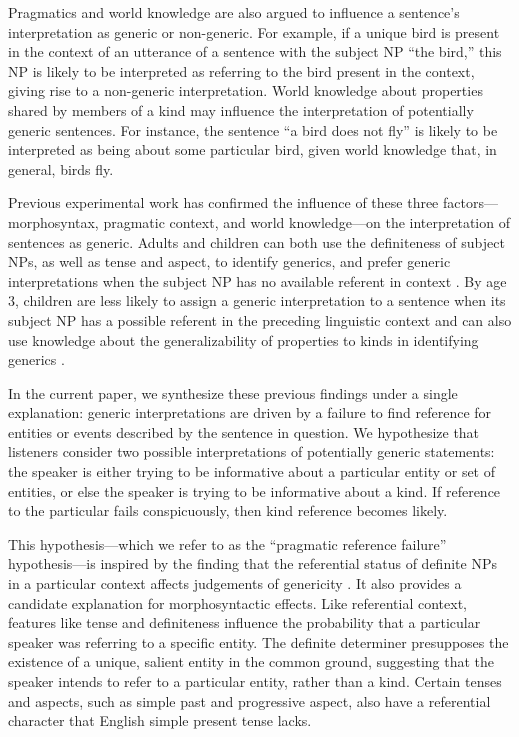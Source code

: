 \documentclass[10pt,letterpaper]{article}
\begin{document}
Pragmatics and world knowledge are also argued to influence a sentence's interpretation as generic or non-generic. For example, if a unique bird is present in the context of an utterance of a sentence with the subject NP ``the bird,'' this NP is likely to be interpreted as referring to the bird present in the context, giving rise to a non-generic interpretation. World knowledge about properties shared by members of a kind may influence the interpretation of potentially generic sentences. For instance, the sentence ``a bird does not fly'' is likely to be interpreted as being about some particular bird, given world knowledge that, in general, birds fly.

Previous experimental work has confirmed the influence of these three factors---morphosyntax, pragmatic context, and world knowledge---on the interpretation of sentences as generic. Adults and children can both use the definiteness of subject NPs, as well as tense and aspect, to identify generics, and prefer generic interpretations when the subject NP has no available referent in context \cite{Gelman:2003,Cimpian:2011}. By age 3, children are less likely to assign a generic interpretation to a sentence when its subject NP has a possible referent in the preceding linguistic context and can also use knowledge about the generalizability of properties to kinds in identifying generics \cite{Cimpian:2008}. 

In the current paper, we synthesize these previous findings under a single explanation: generic interpretations are driven by a failure to find reference for entities or events described by the sentence in question. We hypothesize that listeners consider two possible interpretations of potentially generic statements: the speaker is either trying to be informative about a particular entity or set of entities, or else the speaker is trying to be informative about a kind. If reference to the particular fails conspicuously, then kind reference becomes likely.


This hypothesis---which we refer to as the ``pragmatic reference failure'' hypothesis---is inspired by the finding that the referential status of definite NPs in a particular context affects judgements of genericity \cite{Gelman:2003}. It also provides a candidate explanation for morphosyntactic effects. Like referential context, features like tense and definiteness influence the probability that a particular speaker was referring to a specific entity. The definite determiner presupposes the existence of a unique, salient entity in the common ground, suggesting that the speaker intends to refer to a particular entity, rather than a kind. Certain tenses and aspects, such as simple past and progressive aspect, also have a referential character that English simple present tense lacks. 
\end{document}
